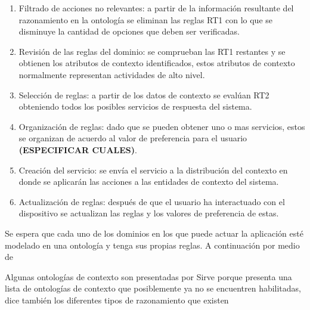 \begin{enumerate}
    \item Filtrado de acciones no relevantes: a partir de la información resultante del razonamiento en la ontología se eliminan las reglas RT1 con lo que se disminuye la cantidad de opciones que deben ser verificadas.
    \item Revisión de las reglas del dominio: se comprueban las RT1 restantes y se obtienen los atributos de contexto identificados, estos atributos de contexto normalmente representan actividades de alto nivel. 
    \item Selección de reglas: a partir de los datos de contexto se evalúan RT2 obteniendo todos los posibles servicios de respuesta del sistema.
    \item Organización de reglas: dado que se pueden obtener uno o mas servicios, estos se organizan de acuerdo al valor de preferencia para el usuario \textbf{(ESPECIFICAR CUALES)}.
    \item Creación del servicio: se envía el servicio a la distribución del contexto en donde se aplicarán las acciones a las entidades de contexto del sistema.
    \item Actualización de reglas: después de que el usuario ha interactuado con el dispositivo se actualizan las reglas y los valores de preferencia de estas.
\end{enumerate}

Se espera que cada uno de los dominios en los que puede actuar la aplicación esté modelado en una ontología y tenga sus propias reglas.
A continuación por medio de




Algunas ontologías de contexto son presentadas por
\cite{Bikakis2007}Sirve porque presenta una lista de ontologías de contexto que posiblemente ya no se encuentren habilitadas, dice también los diferentes tipos de razonamiento que existen











